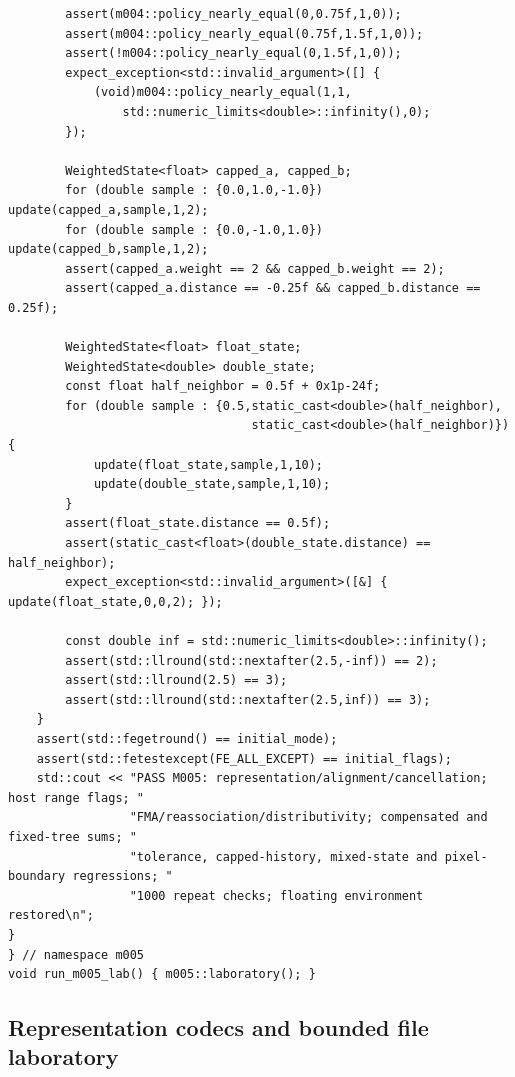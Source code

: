 \begin{verbatim}
        assert(m004::policy_nearly_equal(0,0.75f,1,0));
        assert(m004::policy_nearly_equal(0.75f,1.5f,1,0));
        assert(!m004::policy_nearly_equal(0,1.5f,1,0));
        expect_exception<std::invalid_argument>([] {
            (void)m004::policy_nearly_equal(1,1,
                std::numeric_limits<double>::infinity(),0);
        });

        WeightedState<float> capped_a, capped_b;
        for (double sample : {0.0,1.0,-1.0}) update(capped_a,sample,1,2);
        for (double sample : {0.0,-1.0,1.0}) update(capped_b,sample,1,2);
        assert(capped_a.weight == 2 && capped_b.weight == 2);
        assert(capped_a.distance == -0.25f && capped_b.distance == 0.25f);

        WeightedState<float> float_state;
        WeightedState<double> double_state;
        const float half_neighbor = 0.5f + 0x1p-24f;
        for (double sample : {0.5,static_cast<double>(half_neighbor),
                                  static_cast<double>(half_neighbor)}) {
            update(float_state,sample,1,10);
            update(double_state,sample,1,10);
        }
        assert(float_state.distance == 0.5f);
        assert(static_cast<float>(double_state.distance) == half_neighbor);
        expect_exception<std::invalid_argument>([&] { update(float_state,0,0,2); });

        const double inf = std::numeric_limits<double>::infinity();
        assert(std::llround(std::nextafter(2.5,-inf)) == 2);
        assert(std::llround(2.5) == 3);
        assert(std::llround(std::nextafter(2.5,inf)) == 3);
    }
    assert(std::fegetround() == initial_mode);
    assert(std::fetestexcept(FE_ALL_EXCEPT) == initial_flags);
    std::cout << "PASS M005: representation/alignment/cancellation; host range flags; "
                 "FMA/reassociation/distributivity; compensated and fixed-tree sums; "
                 "tolerance, capped-history, mixed-state and pixel-boundary regressions; "
                 "1000 repeat checks; floating environment restored\n";
}
} // namespace m005
void run_m005_lab() { m005::laboratory(); }
\end{verbatim}

\subsection{Representation codecs and bounded file laboratory}\label{appendix-4e2236f53445-representation-codecs-and-bounded-file-laboratory}

\hypertarget{appendix-4e2236f53445-representation-codecs-and-bounded-file-laboratory}{}

